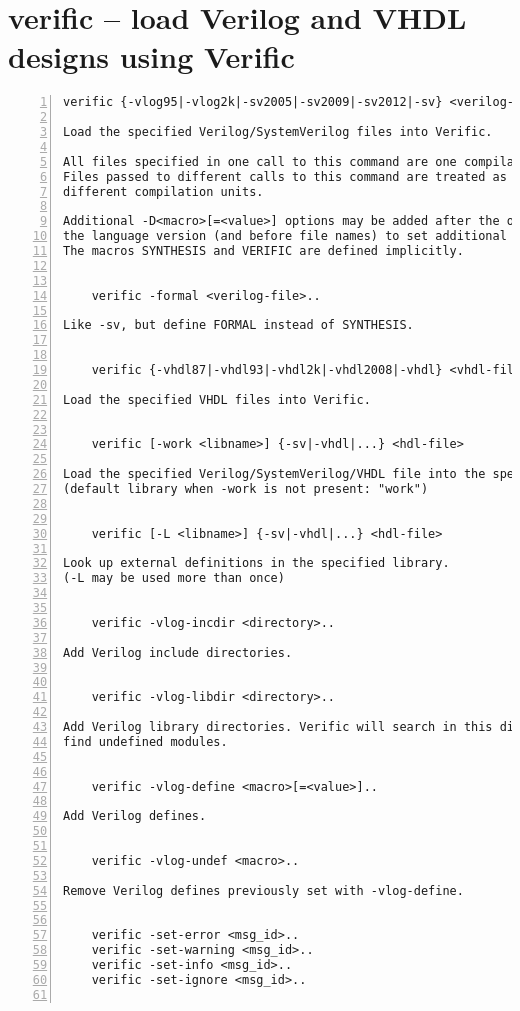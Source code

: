 \section{verific -- load Verilog and VHDL designs using Verific}
\label{cmd:verific}
\begin{lstlisting}[numbers=left,frame=single]
    verific {-vlog95|-vlog2k|-sv2005|-sv2009|-sv2012|-sv} <verilog-file>..

Load the specified Verilog/SystemVerilog files into Verific.

All files specified in one call to this command are one compilation unit.
Files passed to different calls to this command are treated as belonging to
different compilation units.

Additional -D<macro>[=<value>] options may be added after the option indicating
the language version (and before file names) to set additional verilog defines.
The macros SYNTHESIS and VERIFIC are defined implicitly.


    verific -formal <verilog-file>..

Like -sv, but define FORMAL instead of SYNTHESIS.


    verific {-vhdl87|-vhdl93|-vhdl2k|-vhdl2008|-vhdl} <vhdl-file>..

Load the specified VHDL files into Verific.


    verific [-work <libname>] {-sv|-vhdl|...} <hdl-file>

Load the specified Verilog/SystemVerilog/VHDL file into the specified library.
(default library when -work is not present: "work")


    verific [-L <libname>] {-sv|-vhdl|...} <hdl-file>

Look up external definitions in the specified library.
(-L may be used more than once)


    verific -vlog-incdir <directory>..

Add Verilog include directories.


    verific -vlog-libdir <directory>..

Add Verilog library directories. Verific will search in this directories to
find undefined modules.


    verific -vlog-define <macro>[=<value>]..

Add Verilog defines.


    verific -vlog-undef <macro>..

Remove Verilog defines previously set with -vlog-define.


    verific -set-error <msg_id>..
    verific -set-warning <msg_id>..
    verific -set-info <msg_id>..
    verific -set-ignore <msg_id>..


\end{lstlisting}
